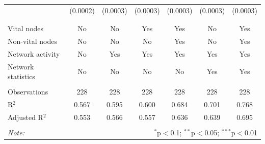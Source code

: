 \begin{table}[!htbp]
\begin{tabular}{@{\extracolsep{5pt}}lcccccc}
  & (0.0002) & (0.0003) & (0.0003) & (0.0003) & (0.0003) & (0.0003) \\ 
  & & & & & & \\ 
\hline \\[-1.8ex] 
Vital nodes & No & No & Yes & Yes & No & Yes \\ 
Non-vital nodes & No & No & No & Yes & No & Yes \\ 
Network activity & No & Yes & Yes & Yes & Yes & Yes \\ 
Network statistics & No & No & No & No & Yes & Yes \\ 
\hline &  &  &  &  &  &  \\ 
Observations & 228 & 228 & 228 & 228 & 228 & 228 \\ 
R$^{2}$ & 0.567 & 0.595 & 0.600 & 0.684 & 0.701 & 0.768 \\ 
Adjusted R$^{2}$ & 0.553 & 0.566 & 0.557 & 0.636 & 0.639 & 0.695 \\ 
\hline 
\hline \\[-1.8ex] 
\textit{Note:}  & \multicolumn{6}{r}{$^{*}$p$<$0.1; $^{**}$p$<$0.05; $^{***}$p$<$0.01} \\ 
\end{tabular} 
\end{table} 
